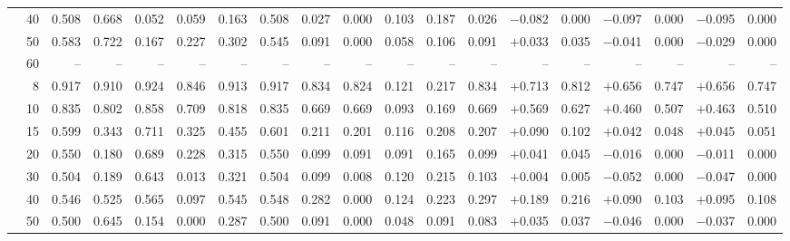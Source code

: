 \documentclass[conference]{IEEEtran}
\theoremstyle{remark}
\begin{document}
\begin{table}[ht]
{\begin{tabular}{p{1.55cm}r rrrr rr rr rr r rr rr rr}
  & 40 & 0.508 & 0.668 & 0.052 & 0.059 & 0.163 & 0.508 & 0.027 & 0.000 & 0.103 & 0.187 & 0.026 & $-$0.082 & 0.000 & $-$0.097 & 0.000 & $-$0.095 & 0.000 \\
  & 50 & 0.583 & 0.722 & 0.167 & 0.227 & 0.302 & 0.545 & 0.091 & 0.000 & 0.058 & 0.106 & 0.091 & $+$0.033 & 0.035 & $-$0.041 & 0.000 & $-$0.029 & 0.000 \\
  & 60 & -- & -- & -- & -- & -- & -- & -- & -- & -- & -- & -- & -- & -- & -- & -- & -- & -- \\
\midrule
{}
  & 8 & 0.917 & 0.910 & 0.924 & 0.846 & 0.913 & 0.917 & 0.834 & 0.824 & 0.121 & 0.217 & 0.834 & $+$0.713 & 0.812 & $+$0.656 & 0.747 & $+$0.656 & 0.747 \\
  & 10 & 0.835 & 0.802 & 0.858 & 0.709 & 0.818 & 0.835 & 0.669 & 0.669 & 0.093 & 0.169 & 0.669 & $+$0.569 & 0.627 & $+$0.460 & 0.507 & $+$0.463 & 0.510 \\
  & 15 & 0.599 & 0.343 & 0.711 & 0.325 & 0.455 & 0.601 & 0.211 & 0.201 & 0.116 & 0.208 & 0.207 & $+$0.090 & 0.102 & $+$0.042 & 0.048 & $+$0.045 & 0.051 \\
  & 20 & 0.550 & 0.180 & 0.689 & 0.228 & 0.315 & 0.550 & 0.099 & 0.091 & 0.091 & 0.165 & 0.099 & $+$0.041 & 0.045 & $-$0.016 & 0.000 & $-$0.011 & 0.000 \\
  & 30 & 0.504 & 0.189 & 0.643 & 0.013 & 0.321 & 0.504 & 0.099 & 0.008 & 0.120 & 0.215 & 0.103 & $+$0.004 & 0.005 & $-$0.052 & 0.000 & $-$0.047 & 0.000 \\
  & 40 & 0.546 & 0.525 & 0.565 & 0.097 & 0.545 & 0.548 & 0.282 & 0.000 & 0.124 & 0.223 & 0.297 & $+$0.189 & 0.216 & $+$0.090 & 0.103 & $+$0.095 & 0.108 \\
  & 50 & 0.500 & 0.645 & 0.154 & 0.000 & 0.287 & 0.500 & 0.091 & 0.000 & 0.048 & 0.091 & 0.083 & $+$0.035 & 0.037 & $-$0.046 & 0.000 & $-$0.037 & 0.000 \\

\end{tabular}}
\end{table}
\end{document}

